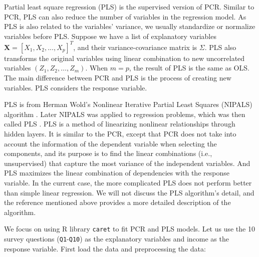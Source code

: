 \documentclass[12pt,]{krantz}
\begin{document}
Partial least square regression (PLS)  is the supervised version of PCR. Similar to PCR, PLS can also reduce the number of variables in the regression model.   As PLS is also related to the variables' variance, we usually standardize or normalize variables before PLS. Suppose we have a list of explanatory variables \(\mathbf{X}=[X_{1},X_{2},...,X_{p}]^{T}\), and their variance-covariance matrix is \(\Sigma\). PLS also transforms the original variables using linear combination to new uncorrelated variables \((Z_{1} , Z_{2} , \ldots , Z_{m})\). When \(m=p\), the result of PLS is the same as OLS. The main difference between PCR and PLS is the process of creating new variables. PLS considers the response variable.

PLS is from Herman Wold's Nonlinear Iterative Partial Least Squares (NIPALS) algorithm \citep{wold1973, wold1982} . Later NIPALS was applied to regression problems, which was then called PLS . PLS is a method of linearizing nonlinear relationships through hidden layers. It is similar to the PCR, except that PCR does not take into account the information of the dependent variable when selecting the components, and its purpose is to find the linear combinations (i.e., unsupervised) that capture the most variance of the independent variables. And PLS maximizes the linear combination of dependencies with the response variable. In the current case, the more complicated PLS does not perform better than simple linear regression. We will not discuss the PLS algorithm's detail, and the reference mentioned above provides a more detailed description of the algorithm.

We focus on using R library \texttt{caret} to fit PCR and PLS models. Let us use the 10 survey questions (\texttt{Q1}-\texttt{Q10}) as the explanatory variables and income as the response variable. First load the data and preprocessing the data:
\end{document}
